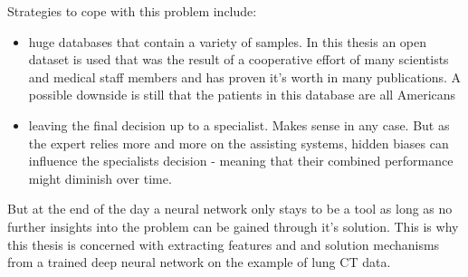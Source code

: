 \documentclass[main.tex]{subfiles}
\begin{document}
Strategies to cope with this problem include:
\begin{itemize}
\item huge databases that contain a variety of samples. In this thesis an open dataset is used that was
the result of a cooperative effort of many scientists and medical staff members and has proven
it's worth in many publications. A possible downside is still that the patients in this database are all Americans

\item leaving the final decision up to a specialist. Makes sense in any case. But as the expert relies more and more on the assisting systems, hidden biases can influence the specialists decision - meaning that their combined performance might diminish over time.
\end{itemize}


But at the end of the day a neural network only stays to be a tool as long as no further insights into
the problem can be gained through it's solution. This is why this thesis is concerned with extracting
features and and solution mechanisms from a trained deep neural network on the example of lung CT data.
\end{document}
